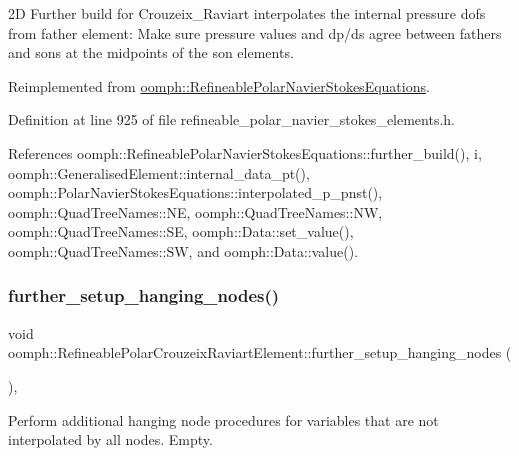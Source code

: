 2D Further build for Crouzeix\+\_\+\+Raviart interpolates the internal pressure dofs from father element\+: Make sure pressure values and dp/ds agree between fathers and sons at the midpoints of the son elements. 

Reimplemented from \hyperlink{classoomph_1_1RefineablePolarNavierStokesEquations_ac75e1f0ff50368bd056a8d39c917e35b}{oomph\+::\+Refineable\+Polar\+Navier\+Stokes\+Equations}.



Definition at line 925 of file refineable\+\_\+polar\+\_\+navier\+\_\+stokes\+\_\+elements.\+h.



References oomph\+::\+Refineable\+Polar\+Navier\+Stokes\+Equations\+::further\+\_\+build(), i, oomph\+::\+Generalised\+Element\+::internal\+\_\+data\+\_\+pt(), oomph\+::\+Polar\+Navier\+Stokes\+Equations\+::interpolated\+\_\+p\+\_\+pnst(), oomph\+::\+Quad\+Tree\+Names\+::\+NE, oomph\+::\+Quad\+Tree\+Names\+::\+NW, oomph\+::\+Quad\+Tree\+Names\+::\+SE, oomph\+::\+Data\+::set\+\_\+value(), oomph\+::\+Quad\+Tree\+Names\+::\+SW, and oomph\+::\+Data\+::value().

\mbox{\label{classoomph_1_1RefineablePolarCrouzeixRaviartElement_a4dabb74925f410045d1d7208a3b29130}} 
\subsubsection{\texorpdfstring{further\+\_\+setup\+\_\+hanging\+\_\+nodes()}{further\_setup\_hanging\_nodes()}}
{\footnotesize\ttfamily void oomph\+::\+Refineable\+Polar\+Crouzeix\+Raviart\+Element\+::further\+\_\+setup\+\_\+hanging\+\_\+nodes (\begin{DoxyParamCaption}{ }\end{DoxyParamCaption})\hspace{0.3cm}{\ttfamily [inline]}, {\ttfamily [virtual]}}



Perform additional hanging node procedures for variables that are not interpolated by all nodes. Empty. 



